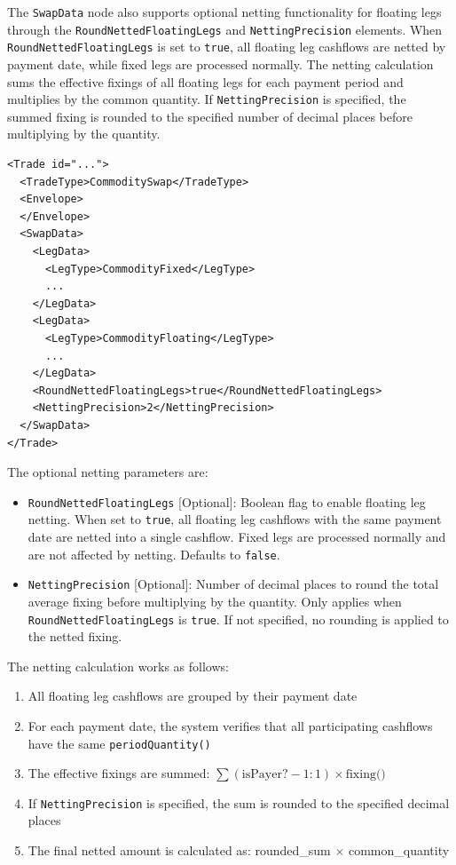 The \lstinline!SwapData! node also supports optional netting functionality for floating legs through the \lstinline!RoundNettedFloatingLegs! and \lstinline!NettingPrecision! elements. When \lstinline!RoundNettedFloatingLegs! is set to \lstinline!true!, all floating leg cashflows are netted by payment date, while fixed legs are processed normally. The netting calculation sums the effective fixings of all floating legs for each payment period and multiplies by the common quantity. If \lstinline!NettingPrecision! is specified, the summed fixing is rounded to the specified number of decimal places before multiplying by the quantity.

\begin{listing}[h!]
\begin{verbatim}
<Trade id="...">
  <TradeType>CommoditySwap</TradeType>
  <Envelope>
  </Envelope>
  <SwapData>
    <LegData>
      <LegType>CommodityFixed</LegType>
      ...
    </LegData>
    <LegData>
      <LegType>CommodityFloating</LegType>
      ...
    </LegData>
    <RoundNettedFloatingLegs>true</RoundNettedFloatingLegs>
    <NettingPrecision>2</NettingPrecision>
  </SwapData>
</Trade>
\end{verbatim}
\caption{Commodity Swap}
\label{lst:commodityswap_data}
\end{listing}

The optional netting parameters are:

\begin{itemize}
\item \lstinline!RoundNettedFloatingLegs! [Optional]: Boolean flag to enable floating leg netting. When set to \lstinline!true!, all floating leg cashflows with the same payment date are netted into a single cashflow. Fixed legs are processed normally and are not affected by netting. Defaults to \lstinline!false!.

\item \lstinline!NettingPrecision! [Optional]: Number of decimal places to round the total average fixing before multiplying by the quantity. Only applies when \lstinline!RoundNettedFloatingLegs! is \lstinline!true!. If not specified, no rounding is applied to the netted fixing.
\end{itemize}

The netting calculation works as follows:
\begin{enumerate}
\item All floating leg cashflows are grouped by their payment date
\item For each payment date, the system verifies that all participating cashflows have the same \lstinline!periodQuantity()!
\item The effective fixings are summed: $\sum (\text{isPayer} ? -1 : 1) \times \text{fixing()}$
\item If \lstinline!NettingPrecision! is specified, the sum is rounded to the specified decimal places
\item The final netted amount is calculated as: rounded\_sum $\times$ common\_quantity
\end{enumerate}
